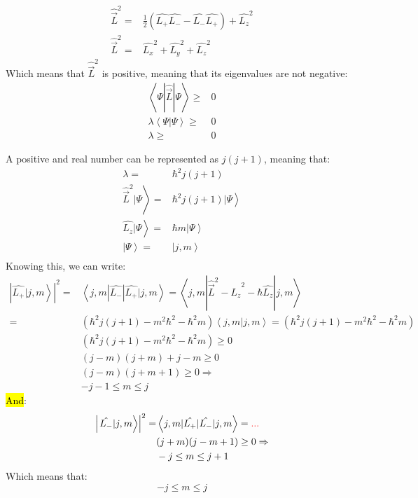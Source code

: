			\begin{align}
				\hat{\vec{L}}^2 =& \frac{1}{2}\left(\hat{L_+}\hat{L_-} - \hat{L_-}\hat{L_+}\right) + \hat{L_z}^2 \\
				\hat\vec{{L}}^2 =& \hat{L_x}^2 + \hat{L_y}^2 + \hat{L_z}^2
			\end{align}
			Which means that $\hat{\vec{L}}^2$ is positive, meaning that its eigenvalues are not negative:
			\begin{align}
				\left\langle \Psi | \hat{\vec{L}} | \Psi \right\rangle \geq& 0 \\
				\lambda\left\langle \Psi | \Psi \right\rangle \geq& 0 \\
				\lambda \geq& 0 
			\end{align}
			
			A positive and real number can be represented as $j(j + 1)$, meaning that:
			\begin{align}
				\lambda =& \hbar^2 j(j+1) \\
				\left. \hat{\vec{L}}^2 | \Psi \right\rangle =& \left. \hbar^2 j(j+1)| \Psi \right\rangle \\
				\left. \hat{L_z} | \Psi \right\rangle =& \left. \hbar m | \Psi \right\rangle \\
				\left. |\Psi \right\rangle =& \left. |j,m \right\rangle \\ 
			\end{align}
			Knowing this, we can write:
			\begin{align}
				\left|\left. \hat{L_+}|j,m\right\rangle\right|^2 =& \left\langle j,m |\hat{L_-}|\hat{L_+}| j,m \right\rangle = \left\langle j,m |\hat{\vec{L}}^2 - \hat{L_z}^2 - \hbar\hat{L_z}| j,m \right\rangle \\
				=& \left(\hbar^2j(j+1) - m^2\hbar^2 - \hbar^2m\right)\left\langle j,m | j,m \right\rangle = \left(\hbar^2j(j+1) - m^2\hbar^2 - \hbar^2m\right) \\
				& \left(\hbar^2j(j+1) - m^2\hbar^2 - \hbar^2m\right) \geq 0 \\
				& (j - m)(j + m) + j-m \geq 0 \\
				& (j - m)(j + m + 1) \geq 0 \Rightarrow\\
				& -j-1 \leq m \leq j
			\end{align}
			\hl{And}:
			\begin{align}
				\left|\left. \hat{L_-}|j,m\right\rangle\right|^2 =& \left\langle j,m |\hat{L_+}|\hat{L_-}| j,m \right\rangle = \textcolor{red}{...} \\
				& (j + m)(j - m + 1) \geq 0 \Rightarrow\\
				& -j \leq m \leq j + 1
			\end{align}		
			Which means that:
			\begin{equation}
				- j \leq m \leq j		
			\end{equation}
			
